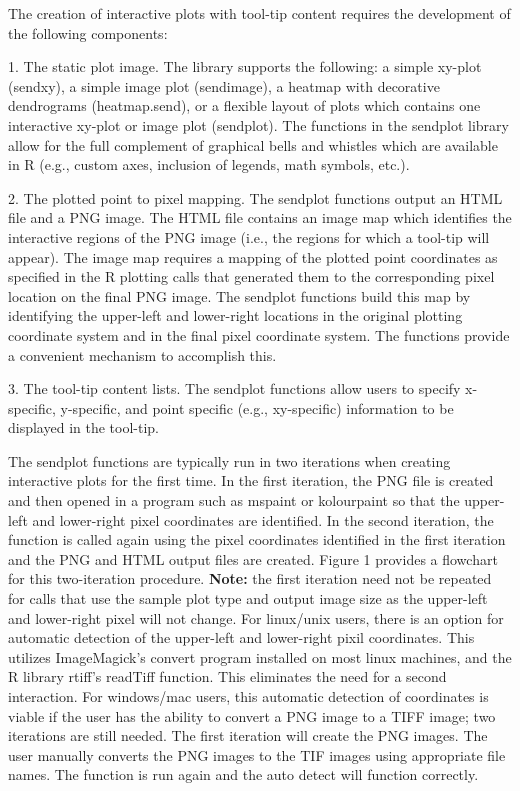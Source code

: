 \documentclass[]{article}
\begin{document}
\indent The creation of interactive plots with tool-tip content requires the development of the following components:
\begin{description}
\item 1. The static plot image. The library supports the following: a simple xy-plot (sendxy), a simple image plot (sendimage), a heatmap with decorative dendrograms (heatmap.send), or a flexible layout of plots which contains one interactive xy-plot or image plot (sendplot). The functions in the sendplot library allow for the full complement of graphical bells and whistles which are available in R (e.g., custom axes, inclusion of legends, math symbols, etc.). 
\item 2. The plotted point to pixel mapping. The sendplot functions output an HTML file and a PNG image. The HTML file contains an image map which identifies the interactive regions of the PNG image (i.e., the regions for which a tool-tip will appear). The image map requires a mapping of the plotted point coordinates as specified in the R plotting calls that generated them to the corresponding pixel location on the final PNG image. The sendplot functions build this map by identifying the upper-left and lower-right locations in the original plotting coordinate system and in the final pixel coordinate system. The functions provide a convenient mechanism to accomplish this.
\item 3. The tool-tip content lists. The sendplot functions allow users to specify  x-specific, y-specific, and point specific (e.g., xy-specific) information to be displayed in the tool-tip. 
\end{description}
The sendplot functions are typically run in two iterations when creating interactive plots for the first time. In the first iteration, the PNG file is created and then opened in a program such as mspaint or kolourpaint so that the upper-left and lower-right pixel coordinates are identified. In the second iteration, the function is called again using the pixel coordinates identified in the first iteration and the PNG and HTML output files are created. Figure 1 provides a flowchart for this two-iteration procedure. {\bf{Note:}} the first iteration need not be repeated for calls that use the sample plot type and output image size as the upper-left and lower-right pixel will not change. \newline
\indent For linux/unix users, there is an option for automatic detection of the upper-left and lower-right pixil coordinates. This utilizes ImageMagick's convert program installed on most linux machines, and the R library rtiff's readTiff function. This eliminates the need for a second interaction. For windows/mac users, this automatic detection of coordinates is viable if the user has the ability to convert a PNG image to a TIFF image; two iterations are still needed. The first iteration will create the PNG images. The user manually converts the PNG images to the TIF images using appropriate file names. The function is run again and the auto detect will function correctly.  
\end{document}
